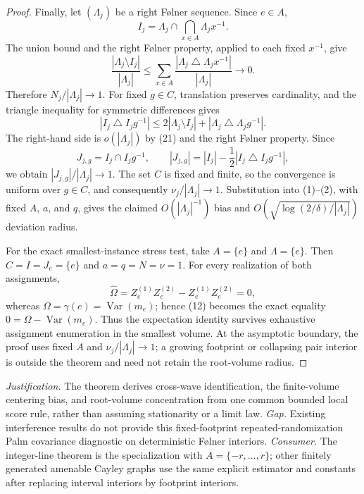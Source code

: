 \documentclass{article}
\begin{document}
\begin{proof}
Finally, let \((\Lambda_j)\) be a right F\o lner sequence.  Since \(e\in A\),
\[
 I_j=\Lambda_j\cap\bigcap_{x\in A}\Lambda_jx^{-1}.
\]
The union bound and the right F\o lner property, applied to each fixed \(x^{-1}\), give
\[
 \frac{|\Lambda_j\setminus I_j|}{|\Lambda_j|}
 \le\sum_{x\in A}
 \frac{|\Lambda_j\mathbin\triangle\Lambda_jx^{-1}|}{|\Lambda_j|}
 \longrightarrow0. \tag{21}
\]
Therefore \(N_j/|\Lambda_j|\to1\).  For fixed \(g\in C\), translation preserves cardinality, and the triangle inequality for symmetric differences gives
\[
 |I_j\mathbin\triangle I_jg^{-1}|
 \le2|\Lambda_j\setminus I_j|
   +|\Lambda_j\mathbin\triangle\Lambda_jg^{-1}|. \tag{22}
\]
The right-hand side is \(o(|\Lambda_j|)\) by (21) and the right F\o lner property.  Since
\[
 J_{j,g}=I_j\cap I_jg^{-1},
 \qquad
 |J_{j,g}|=|I_j|-\frac12|I_j\mathbin\triangle I_jg^{-1}|,
\]
we obtain \(|J_{j,g}|/|\Lambda_j|\to1\).  The set \(C\) is fixed and finite, so the convergence is uniform over \(g\in C\), and consequently \(\nu_j/|\Lambda_j|\to1\).  Substitution into (1)--(2), with fixed \(A\), \(a\), and \(q\), gives the claimed \(O(|\Lambda_j|^{-1})\) bias and \(O(\sqrt{\log(2/\delta)/|\Lambda_j|})\) deviation radius.

For the exact smallest-instance stress test, take \(A=\{e\}\) and \(\Lambda=\{e\}\).  Then \(C=I=J_e=\{e\}\) and \(a=q=N=\nu=1\).  For every realization of both assignments,
\[
 \widehat\Omega
 =Z_e^{(1)}Z_e^{(2)}
  -Z_e^{(1)}Z_e^{(2)}=0,
\]
whereas \(\Omega=\gamma(e)=\operatorname{Var}(m_e)\); hence (12) becomes the exact equality \(0=\Omega-\operatorname{Var}(m_e)\).  Thus the expectation identity survives exhaustive assignment enumeration in the smallest volume.  At the asymptotic boundary, the proof uses fixed \(A\) and \(\nu_j/|\Lambda_j|\to1\); a growing footprint or collapsing pair interior is outside the theorem and need not retain the root-volume radius.
\end{proof}
\par\smallskip\noindent \textit{Justification.} The theorem derives cross-wave identification, the finite-volume centering bias, and root-volume concentration from one common bounded local score rule, rather than assuming stationarity or a limit law. \textit{Gap.} Existing interference results do not provide this fixed-footprint repeated-randomization Palm covariance diagnostic on deterministic F\o lner interiors. \textit{Consumer.} The integer-line theorem is the specialization with \(A=\{-r,\ldots,r\}\); other finitely generated amenable Cayley graphs use the same explicit estimator and constants after replacing interval interiors by footprint interiors.
\end{document}
